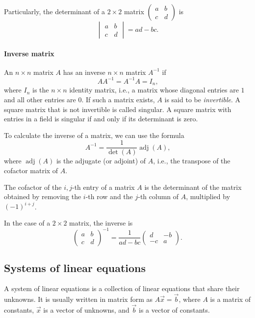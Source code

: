 Particularly, the determinant of a $2 \times 2$ matrix $\begin{pmatrix} a & b \\ c & d
\end{pmatrix}$ is $$\begin{vmatrix} a & b \\ c & d \end{vmatrix} = ad - bc\text{.}$$

\paragraph{Inverse matrix}  An $n \times n$ matrix $A$ has an inverse $n \times n$ matrix
$A^{-1}$ if
\[
  A A^{-1} = A^{-1} A = I_n\text{,}
\]
where $I_n$ is the $n \times n$ identity matrix, i.e., a matrix whose diagonal entries are
$1$ and all other entries are $0$. If such a matrix exists, $A$ is said to be
\emph{invertible}.  A square matrix that is not invertible is called singular. A square
matrix with entries in a field is singular if and only if its determinant is zero.

To calculate the inverse of a matrix, we can use the formula
\[
  A^{-1} = \frac{1}{\det(A)} \operatorname{adj}(A)\text{,}
\]
where $\operatorname{adj}(A)$ is the adjugate (or adjoint) of $A$, i.e., the transpose of the cofactor matrix
of $A$.

The cofactor of the $i, j$-th entry of a matrix $A$ is the determinant of the matrix
obtained by removing the $i$-th row and the $j$-th column of $A$, multiplied by $(-1)^{i
+ j}$.

In the case of a $2 \times 2$ matrix, the inverse is
\[
  \begin{pmatrix}
    a & b \\
    c & d
  \end{pmatrix}^{-1} = \frac{1}{ad - bc}
  \begin{pmatrix}
    d & -b \\
    -c & a
  \end{pmatrix}\text{.}
\]

\subsection{Systems of linear equations}

A system of linear equations is a collection of linear equations that share their
unknowns.  It is usually written in matrix form as $A \vec{x} = \vec{b}$, where $A$ is a
matrix of constants, $\vec{x}$ is a vector of unknowns, and $\vec{b}$ is a vector of
constants.

